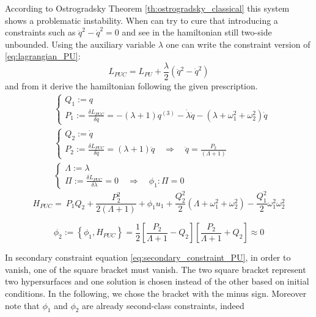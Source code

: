 According to Ostrogradsky Theorem \ref{th:ostrogradsky_classical} this system
shows a problematic instability. When can try to cure that introducing a
constraints such as $\ddot{q}^2 - \dot{q}^2 = 0$ and see in the hamiltonian
still two-side unbounded. Using the auxiliary variable $\lambda$ one can write
the constraint version of \eqref{eq:lagrangian_PU}:
\begin{equation} \label{eq:lagrangian_PUC}
  L_{PUC} = L_{PU} + \frac{\lambda}{2} \left(\ddot{q}^2 - \dot{q}^2\right)
\end{equation}
and from it derive the hamiltonian following the given prescription.
\begin{align*}
  & \begin{cases}
    Q_1 := q \\
    P_1 := \frac{\delta L_{PUC}}{\delta \dot{q}} =
        - (\lambda + 1) q^{(3)} - \dot{\lambda}\ddot{q}
        - (\lambda + \omega_1^2 + \omega_2^2)\dot{q}
  \end{cases} \\
  & \begin{cases}
    Q_2 := \dot{q} \\
    P_2 := \frac{\delta L_{PUC}}{\delta \ddot{q}} =
        (\lambda + 1) \ddot{q}
        \quad  \Rightarrow \quad \ddot{q} = \frac{P_2}{(\Lambda + 1)}
  \end{cases} \\
  & \begin{cases}
    \Lambda := \lambda \\
    \Pi := \frac{\delta L_{PUC}}{\delta \lambda} = 0
        \quad  \Rightarrow \quad \phi_1: \Pi = 0
  \end{cases}
\end{align*}
\begin{equation} \label{eq:ham_PUC_with_aux_vars}
   H_{PUC} =\ P_1 Q_2 + \frac{P_2^2}{2(\Lambda + 1)} + \phi_1 u_1
  + \frac{Q_2^2}{2} \left(\Lambda + \omega_1^2 + \omega_2^2 \right)
  - \frac{Q_1^2}{2} \omega_1^2 \omega_2^2
\end{equation}

\begin{equation} \label{eq:secondary_constraint_PU}
  \phi_2 :=
  \left\{ \phi_1, H_{PUC} \right\} =
  \frac{1}{2} \left[ \frac{P_2}{\Lambda + 1} - Q_2 \right]
  \left[ \frac{P_2}{\Lambda + 1} + Q_2 \right]
  \approx 0
\end{equation}

In secondary constraint equation \eqref{eq:secondary_constraint_PU}, in order
to vanish, one of the square bracket must vanish. The two square bracket
represent two hypersurfaces and one solution is chosen instead of the other
based on initial conditions. In the following, we chose the bracket with the
minus sign. Moreover note that $\phi_1$ and $\phi_2$ are already second-class
constraints, indeed

